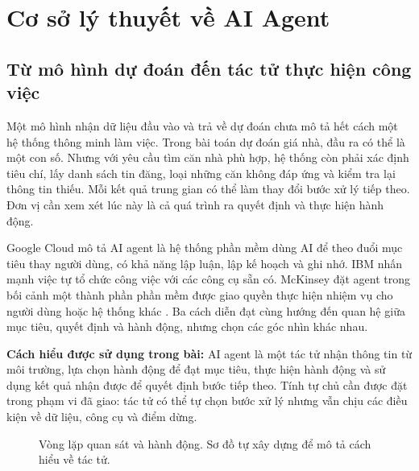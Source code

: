 \chapter{Cơ sở lý thuyết về AI Agent}
\label{chap:theory}
\section{Từ mô hình dự đoán đến tác tử thực hiện công việc}
Một mô hình nhận dữ liệu đầu vào và trả về dự đoán chưa mô tả hết cách một hệ thống thông minh làm việc. Trong bài toán dự đoán giá nhà, đầu ra có thể là một con số. Nhưng với yêu cầu tìm căn nhà phù hợp, hệ thống còn phải xác định tiêu chí, lấy danh sách tin đăng, loại những căn không đáp ứng và kiểm tra lại thông tin thiếu. Mỗi kết quả trung gian có thể làm thay đổi bước xử lý tiếp theo. Đơn vị cần xem xét lúc này là cả quá trình ra quyết định và thực hiện hành động.

Google Cloud mô tả AI agent là hệ thống phần mềm dùng AI để theo đuổi mục tiêu thay người dùng, có khả năng lập luận, lập kế hoạch và ghi nhớ. IBM nhấn mạnh việc tự tổ chức công việc với các công cụ sẵn có. McKinsey đặt agent trong bối cảnh một thành phần phần mềm được giao quyền thực hiện nhiệm vụ cho người dùng hoặc hệ thống khác \cite{google,ibm,mckinsey}. Ba cách diễn đạt cùng hướng đến quan hệ giữa mục tiêu, quyết định và hành động, nhưng chọn các góc nhìn khác nhau.

\textbf{Cách hiểu được sử dụng trong bài:} AI agent là một tác tử nhận thông tin từ môi trường, lựa chọn hành động để đạt mục tiêu, thực hiện hành động và sử dụng kết quả nhận được để quyết định bước tiếp theo. Tính tự chủ cần được đặt trong phạm vi đã giao: tác tử có thể tự chọn bước xử lý nhưng vẫn chịu các điều kiện về dữ liệu, công cụ và điểm dừng.

\begin{figure}[H]\centering
{}
\caption{Vòng lặp quan sát và hành động. Sơ đồ tự xây dựng để mô tả cách hiểu về tác tử.}
\end{figure}

